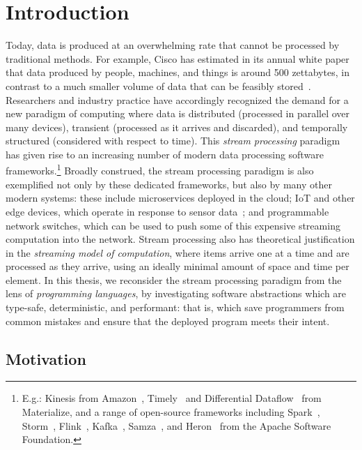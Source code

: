 \chapter{Introduction}
\label{cha:intro}

Today, data is produced at an overwhelming rate
that cannot be processed by traditional methods.
For example, Cisco has estimated in its annual white paper
that data produced by people, machines, and things
is around 500 zettabytes, in contrast to a much smaller volume
of data that can be feasibly stored~\cite{index2018forecast}.
Researchers and industry practice have accordingly recognized the demand
for a new paradigm of computing where data is
distributed (processed in parallel over many devices),
transient (processed as it arrives and discarded),
and temporally structured (considered with respect to time).
This \emph{stream processing} paradigm has given rise to an increasing number
of modern data processing software frameworks.\footnote{E.g.: Kinesis from Amazon~\cite{AmazonKinesis}, Timely~\cite{Timely} and Differential Dataflow~\cite{mcsherry2013differential} from Materialize, and a range of open-source frameworks including Spark~\cite{SparkStreaming}, Storm~\cite{Storm}, Flink~\cite{Flink}, Kafka~\cite{garg2013apache}, Samza~\cite{Samza2017}, and Heron~\cite{Heron} from the Apache Software Foundation.}
Broadly construed, the stream processing paradigm is also exemplified not only by these dedicated frameworks, but also by many other modern systems: these include microservices deployed in the cloud; IoT and other edge devices, which operate in response
to sensor data~\cite{shi2016edge, ashton2009internet}; and programmable network switches,
which can be used to push some of this expensive streaming computation
into the network.
Stream processing also has theoretical justification in the \emph{streaming model of computation},
where items arrive one at a time and are processed as they arrive, using
an ideally minimal amount of space and time per element.
In this thesis, we reconsider the stream processing paradigm from the lens of \emph{programming languages}, by investigating software abstractions which are type-safe, deterministic, and performant: that is, which save programmers from common mistakes and ensure that the deployed program meets their intent.

\section{Motivation}

